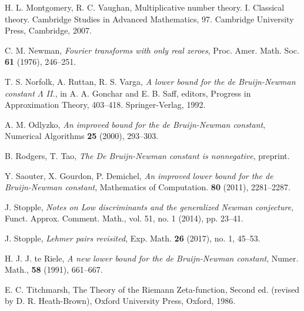 \documentclass[a4paper,11pt,twoside]{amsart}
\begin{document}
\begin{thebibliography}{99}
H. L. Montgomery, R. C. Vaughan, Multiplicative number theory. I. Classical theory. Cambridge Studies in Advanced Mathematics, 97. Cambridge University Press, Cambridge, 2007.

C. M. Newman, \emph{Fourier transforms with only real zeroes}, Proc. Amer. Math. Soc. \textbf{61} (1976), 246--251.

T. S. Norfolk, A. Ruttan, R. S. Varga, \emph{A lower bound for the de Bruijn-Newman
constant $\Lambda$ II.}, in A. A. Gonchar and E. B. Saff, editors, Progress in Approximation
Theory, 403--418. Springer-Verlag, 1992.

A. M. Odlyzko, \emph{An improved bound for the de Bruijn-Newman constant}, Numerical Algorithms \textbf{25} (2000), 293--303.

B. Rodgers, T. Tao, \emph{The De Bruijn-Newman constant is nonnegative}, preprint.

Y. Saouter, X. Gourdon, P. Demichel, \emph{An improved lower bound for the de Bruijn-Newman constant}, Mathematics of Computation. \textbf{80} (2011), 2281--2287. 

J. Stopple, \emph{Notes on Low discriminants and the generalized Newman conjecture}, Funct. Approx. Comment.
Math., vol. 51, no. 1 (2014), pp. 23--41.

J. Stopple, \emph{Lehmer pairs revisited}, Exp. Math. \textbf{26} (2017), no. 1, 45--53. 

H. J. J. te Riele, \emph{A new lower bound for the de Bruijn-Newman constant}, Numer. Math., \textbf{58} (1991), 661--667.

E. C. Titchmarsh, The Theory of the Riemann Zeta-function, Second ed. (revised by D. R. Heath-Brown), Oxford University Press, Oxford, 1986.	


\end{thebibliography} 
\end{document}
